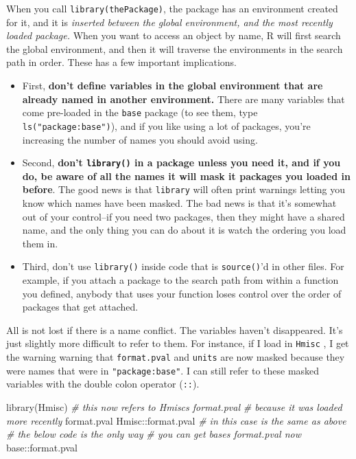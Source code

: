 \documentclass[
  12pt,
  krantz2]{krantz}
\makeatletter
\newenvironment{Shaded}{\begin{snugshade}}{\end{snugshade}}
\newcommand{\CommentTok}[1]{\textcolor[rgb]{0.37,0.37,0.37}{\textit{#1}}}
\newcommand{\FunctionTok}[1]{\textcolor[rgb]{0,0,0}{#1}}
\newcommand{\NormalTok}[1]{#1}
\newcommand{\SpecialCharTok}[1]{\textcolor[rgb]{0,0,0}{#1}}
\newenvironment{kframe}{%
\medskip{}
\setlength{\fboxsep}{.8em}
 \def\at@end@of@kframe{}%
 \ifinner\ifhmode%
  \def\at@end@of@kframe{\end{minipage}}%
  \begin{minipage}{\columnwidth}%
 \fi\fi%
 \def\FrameCommand##1{\hskip\@totalleftmargin \hskip-\fboxsep
 \colorbox{shadecolor}{##1}\hskip-\fboxsep
     \hskip-\linewidth \hskip-\@totalleftmargin \hskip\columnwidth}%
 \MakeFramed {\advance\hsize-\width
   \@totalleftmargin\z@ \linewidth\hsize
   \@setminipage}}%
 {\par\unskip\endMakeFramed%
 \at@end@of@kframe}
\renewenvironment{Shaded}{\begin{kframe}}{\end{kframe}}
\makeatother
\begin{document}
When you call \texttt{library(thePackage)}, the package has an environment created for it, and it is \emph{inserted between the global environment, and the most recently loaded package.} When you want to access an object by name, R will first search the global environment, and then it will traverse the environments in the search path in order. These has a few important implications.

\begin{itemize}
\item
  First, \textbf{don't define variables in the global environment that are already named in another environment.} There are many variables that come pre-loaded in the \texttt{base} package (to see them, type \texttt{ls("package:base")}), and if you like using a lot of packages, you're increasing the number of names you should avoid using.
\item
  Second, \textbf{don't \texttt{library()} in a package unless you need it, and if you do, be aware of all the names it will mask it packages you loaded in before}. The good news is that \texttt{library} will often print warnings letting you know which names have been masked. The bad news is that it's somewhat out of your control--if you need two packages, then they might have a shared name, and the only thing you can do about it is watch the ordering you load them in.
\item
  Third, don't use \texttt{library()} inside code that is \texttt{source()}'d in other files. For example, if you attach a package to the search path from within a function you defined, anybody that uses your function loses control over the order of packages that get attached.
\end{itemize}

All is not lost if there is a name conflict. The variables haven't disappeared. It's just slightly more difficult to refer to them. For instance, if I load in \texttt{Hmisc} \citep{hmisc}, I get the warning warning that \texttt{format.pval} and \texttt{units} are now masked because they were names that were in \texttt{"package:base"}. I can still refer to these masked variables with the double colon operator (\texttt{::}).

\begin{Shaded}
\begin{Highlighting}[]
\FunctionTok{library}\NormalTok{(Hmisc)}
\CommentTok{\# this now refers to Hmisc\textquotesingle{}s format.pval }
\CommentTok{\# because it was loaded more recently}
\NormalTok{format.pval }
\NormalTok{Hmisc}\SpecialCharTok{::}\NormalTok{format.pval }\CommentTok{\# in this case is the same as above}
\CommentTok{\# the below code is the only way }
\CommentTok{\# you can get base\textquotesingle{}s format.pval now}
\NormalTok{base}\SpecialCharTok{::}\NormalTok{format.pval  }
\end{Highlighting}
\end{Shaded}
\end{document}
